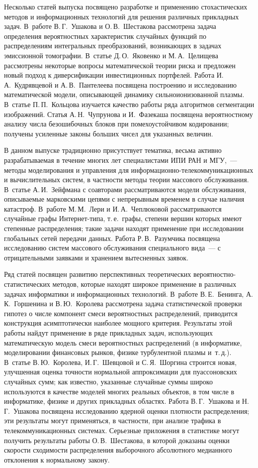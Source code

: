 {{{Несколько статей выпуска посвящено разработке и применению стохастических методов и 
информационных технологий для решения различных прикладных задач. В~работе В.\,Г.~Ушакова 
и О.\,В.~Шестакова рассмотрена задача определения вероятностных характеристик случайных 
функций по распределениям интегральных преобразований, возникающих в задачах эмиссионной 
томографии. В~статье Д.\,О.~Яковенко и М.\,А.~Целищева рассмотрены некоторые вопросы 
математической теории риска и предложен новый подход к диверсификации инвестиционных 
портфелей. Работа И.\,А.~Кудрявцевой и А.\,В.~Пантелеева посвящена построению и 
исследованию математической модели, описывающей динамику сильноионизованной плазмы. 
В~статье П.\,П.~Кольцова изучается качество работы ряда алгоритмов сегментации изображений. 
Статья А.\,Н.~Чупрунова и И.~Фазекаша посвящена вероятностному анализу числа без\-оши\-бочных 
блоков при помехоустойчивом кодировании; получены усиленные законы больших чисел для указанных 
величин.

В данном выпуске традиционно присутствует тематика, весьма активно разрабатываемая в течение 
многих лет специалистами ИПИ РАН и МГУ,~--- методы моделирования и управления для 
информационно-телекоммуникационных и вычислительных систем, в частности методы 
теории массового обслуживания. В~статье А.\,И.~Зейфмана с соавторами рассматриваются 
модели обслуживания, описываемые марковскими цепями с непрерывным временем в случае 
наличия катастроф. В~работе М.\,М.~Лери и И.\,А.~Чеплюковой рассматриваются случайные 
графы Интернет-типа, т.\,е.\ графы, степени вершин которых имеют степенные распределения; 
такие задачи находят применение при исследовании глобальных сетей передачи данных. 
Работа Р.\,В.~Разумчика посвящена исследованию систем массового обслуживания специального 
вида~--- с отрицательными заявками и хранением вытесненных заявок.

Ряд статей посвящен развитию перспективных теоретических 
вероятностно-статистических методов, которые находят широкое применение в различных 
задачах информатики и информационных технологий. В~работе В.\,Е.~Бенинга, А.\,К.~Горшенина 
и В.\,Ю.~Королева рассмотрена задача статистической проверки гипотез о числе компонент 
смеси вероятностных распределений, приводится конструкция асимптотически наиболее мощного 
критерия. Результаты этой работы найдут применение в ряде прикладных задач, использующих 
математическую модель смеси вероятностных распределений (в информатике, моделировании 
финансовых рынков, физике турбулентной плазмы и~т.\,д.). В~статье В.\,Ю.~Королева, 
И.\,Г.~Шевцовой и С.\,Я.~Шоргина строится новая, улучшенная оценка точности нормальной 
аппроксимации для пуассоновских случайных сумм; как известно, указанные случайные суммы 
широко используются в качестве моделей многих реальных объектов, в том числе в информатике, 
физике и других прикладных областях. Работа В.\,Г.~Ушакова и Н.\,Г.~Ушакова посвящена 
исследованию ядерной оценки плотности распределения; эти результаты могут применяться, 
в част\-ности, при анализе трафика в телекоммуникационных системах. Серьезные приложения 
в статистике могут получить результаты работы О.\,В.~Шестакова, в которой доказаны оценки 
скорости сходимости распределения выборочного абсолютного медианного отклонения к нормальному 
закону. 

}}}

